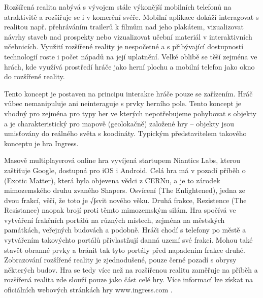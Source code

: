\documentclass[twoside,12pt]{article}
\begin{document}
Rozšířená realita nabývá s vývojem stále výkonější mobilních telefonů na atraktivitě a rozšiřuje se i v komerční svéře. Mobilní aplikace dokáží interagovat s realitou např. přehráváním trailerů k filmům nad jeho plakátem, vizualizovat návrhy staveb nad prospekty nebo vizualizovat učební materiál v interaktivních učebnicích. Využití rozšířené reality je nespočetné a s přibývající dostupností technologií roste i počet nápadů na její uplatnění. Velké oblibě se těší zejména ve hrách, kde využívá prostředí hráče jako herní plochu a mobilní telefon jako okno do rozšířené reality.

Tento koncept je postaven na principu interakce hráče pouze se zařízením. Hráč vůbec nemanipuluje ani neinteraguje s prvky herního pole. Tento koncept je vhodný pro zejména pro typy her ve kterých nepotřebujeme pohybovat s objekty a je charakteristický pro mapově (geolokačně) založené hry -- objekty jsou umisťovány do reálného světa s koodináty. Typickým představitelem takového konceptu je hra Ingress.

%
% 

Masově multiplayerová online hra vyvíjená startupem Niantics Labs, kterou zaštiťuje Google, dostupná pro iOS i Android. Celá hra má v pozadí příběh o  (Exotic Matter), která byla objevena vědci z CERNu, a je to zárodek mimozemského druhu zvaného Shapers. Osvícení (The Enlightened), jedna ze dvou frakcí, věří, že toto je √∫svit nového věku. Druhá frakce, Rezistence (The Resistance) naopak brojí proti těmto mimozemským silám. Hra spočívá ve vytváření frakčních portálů na různých místech, zejména na městských památkách, veřejných budovách a podobně. Hráči chodí s telefony po městě a vytvářením takovýchto portálů přivlastňují danná uzemí své frakci. Mohou také stavět obranné prvky a bránit tak tyto portály před napadením frakce druhé. Zobrazování rozšířené reality je zjednodušené, pouze černé pozadí s obrysy některých budov. Hra se tedy více než na rozšířenou realitu zaměřuje na příběh a rozšířená realita zde slouží pouze jako část celé hry. Více informací lze získat na oficiálních webových stránkách hry www.ingress.com \cite{ingress}.
\end{document}

